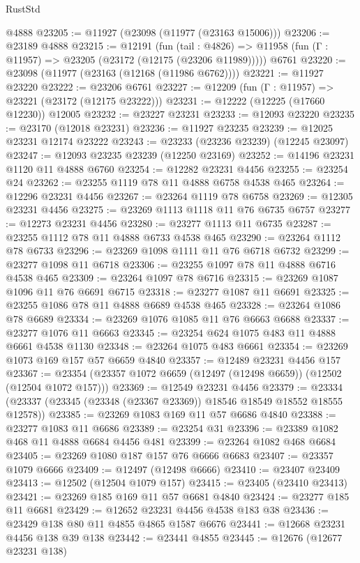 \begin{lexlean}{RustStd}
\begin{coremodule}
    @4888
@23205 := @11927 (@23098 (@11977 (@23163 @15006)))
@23206 := @23189 @4888
@23215 := @12191
    (fun (tail : @4826) => @11958 (fun (Γ : @11957) => @23205 (@23172 (@12175 (@23206 @11989)))))
    @6761
@23220 := @23098 (@11977 (@23163 (@12168 (@11986 @6762))))
@23221 := @11927 @23220
@23222 := @23206 @6761
@23227 := @12209 (fun (Γ : @11957) => @23221 (@23172 (@12175 @23222)))
@23231 := @12222 (@12225 (@17660 @12230)) @12005
@23232 := @23227 @23231
@23233 := @12093 @23220
@23235 := @23170 (@12018 @23231)
@23236 := @11927 @23235
@23239 := @12025 @23231 @12174 @23222
@23243 := @23233 (@23236 @23239) (@12245 @23097)
@23247 := @12093 @23235 @23239 (@12250 @23169)
@23252 := @14196 @23231 @1120 @11 @4888 @6760
@23254 := @12282 @23231 @4456
@23255 := @23254 @24
@23262 := @23255 @1119 @78 @11 @4888 @6758 @4538 @465
@23264 := @12296 @23231 @4456
@23267 := @23264 @1119 @78 @6758
@23269 := @12305 @23231 @4456
@23275 := @23269 @1113 @1118 @11 @76 @6735 @6757
@23277 := @12273 @23231 @4456
@23280 := @23277 @1113 @11 @6735
@23287 := @23255 @1112 @78 @11 @4888 @6733 @4538 @465
@23290 := @23264 @1112 @78 @6733
@23296 := @23269 @1098 @1111 @11 @76 @6718 @6732
@23299 := @23277 @1098 @11 @6718
@23306 := @23255 @1097 @78 @11 @4888 @6716 @4538 @465
@23309 := @23264 @1097 @78 @6716
@23315 := @23269 @1087 @1096 @11 @76 @6691 @6715
@23318 := @23277 @1087 @11 @6691
@23325 := @23255 @1086 @78 @11 @4888 @6689 @4538 @465
@23328 := @23264 @1086 @78 @6689
@23334 := @23269 @1076 @1085 @11 @76 @6663 @6688
@23337 := @23277 @1076 @11 @6663
@23345 := @23254 @624 @1075 @483 @11 @4888 @6661 @4538 @1130
@23348 := @23264 @1075 @483 @6661
@23354 := @23269 @1073 @169 @157 @57 @6659 @4840
@23357 := @12489 @23231 @4456 @157
@23367 := @23354 (@23357 @1072 @6659 (@12497 (@12498 @6659)) (@12502 (@12504 @1072 @157)))
@23369 := @12549 @23231 @4456
@23379 := @23334 (@23337 (@23345 (@23348 (@23367 @23369)) @18546 @18549 @18552 @18555 @12578))
@23385 := @23269 @1083 @169 @11 @57 @6686 @4840
@23388 := @23277 @1083 @11 @6686
@23389 := @23254 @31
@23396 := @23389 @1082 @468 @11 @4888 @6684 @4456 @481
@23399 := @23264 @1082 @468 @6684
@23405 := @23269 @1080 @187 @157 @76 @6666 @6683
@23407 := @23357 @1079 @6666
@23409 := @12497 (@12498 @6666)
@23410 := @23407 @23409
@23413 := @12502 (@12504 @1079 @157)
@23415 := @23405 (@23410 @23413)
@23421 := @23269 @185 @169 @11 @57 @6681 @4840
@23424 := @23277 @185 @11 @6681
@23429 := @12652 @23231 @4456 @4538 @183 @38
@23436 := @23429 @138 @80 @11 @4855 @4865 @1587 @6676
@23441 := @12668 @23231 @4456 @138 @39 @138
@23442 := @23441 @4855
@23445 := @12676 (@12677 @23231 @138)

\end{coremodule}
\end{lexlean}

